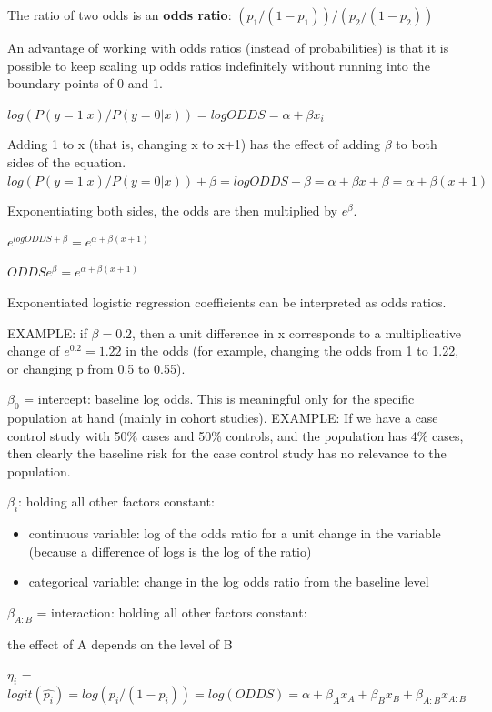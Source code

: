 \documentclass[
]{article}
\begin{document}
The ratio of two odds is an \textbf{odds ratio}:
\((p_1/(1-p_1))/(p_2/(1-p_2))\)

An advantage of working with odds ratios (instead of probabilities) is
that it is possible to keep scaling up odds ratios indefinitely without
running into the boundary points of 0 and 1.

\(log(P(y=1|x)/P(y=0|x))= log ODDS= \alpha +\beta x_i\)

Adding 1 to x (that is, changing x to x+1) has the effect of adding
\(\beta\) to both sides of the equation.
\(log(P(y=1|x)/P(y=0|x)) + \beta = log ODDS + \beta= \alpha +\beta x + \beta = \alpha +\beta (x+1)\)

Exponentiating both sides, the odds are then multiplied by
\(e^{\beta}\).

\(e^{log ODDS + \beta}= e^{\alpha +\beta (x + 1)}\)

\(ODDS e^{\beta}= e^{\alpha +\beta (x + 1)}\)

Exponentiated logistic regression coefficients can be interpreted as
odds ratios.

EXAMPLE: if \(\beta= 0.2\), then a unit difference in x corresponds to a
multiplicative change of \(e^{0.2} = 1.22\) in the odds (for example,
changing the odds from 1 to 1.22, or changing p from 0.5 to 0.55).

\(\beta_0\) = intercept: baseline log odds. This is meaningful only for
the specific population at hand (mainly in cohort studies). EXAMPLE: If
we have a case control study with 50\% cases and 50\% controls, and the
population has 4\% cases, then clearly the baseline risk for the case
control study has no relevance to the population.

\(\beta_i\): holding all other factors constant:

\begin{itemize}
\item
  continuous variable: log of the odds ratio for a unit change in the
  variable (because a difference of logs is the log of the ratio)
\item
  categorical variable: change in the log odds ratio from the baseline
  level
\end{itemize}

\(\beta_{A:B}\) = interaction: holding all other factors constant:

the effect of A depends on the level of B

\(\eta_i\) =
\(logit(\hat{p_i}) = log(p_i/(1-p_i)) = log(ODDS) =\alpha +\beta_A x_A + \beta_B x_B + \beta_{A:B} x_{A:B}\)
\end{document}
